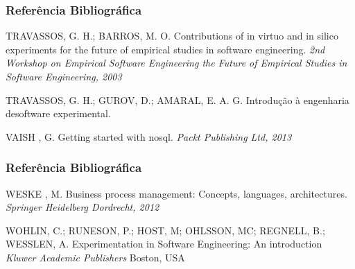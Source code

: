 \documentclass[aspectratio=169]{beamer}
\begin{document}
\begin{frame}
\frametitle{Referência Bibliográfica}
\footnotesize{
\begin{thebibliography}{99} %


 TRAVASSOS, G. H.; BARROS, M. O.
\newblock Contributions of in virtuo and in silico experiments for the future of empirical studies in software engineering.
\newblock \emph{2nd Workshop on Empirical Software Engineering the Future of Empirical Studies in Software Engineering, 2003}



 TRAVASSOS, G. H.; GUROV, D.; AMARAL, E. A. G.
\newblock Introdução à engenharia desoftware experimental.

 VAISH , G.
\newblock Getting started with nosql.
\newblock \emph{Packt Publishing Ltd, 2013}

\end{thebibliography}
}
\end{frame}

\begin{frame}
\frametitle{Referência Bibliográfica}
\footnotesize{
\begin{thebibliography}{99} %


 WESKE , M.
\newblock Business process management: Concepts, languages, architectures.
\newblock \emph{Springer Heidelberg Dordrecht, 2012}

 WOHLIN, C.; RUNESON, P.; HOST, M; OHLSSON, MC; REGNELL, B.; WESSLEN, A.
\newblock Experimentation in Software Engineering: An introduction
\newblock \emph{Kluwer Academic Publishers}
\newblock Boston, USA 

\end{thebibliography}
}
\end{frame}
\end{document}
